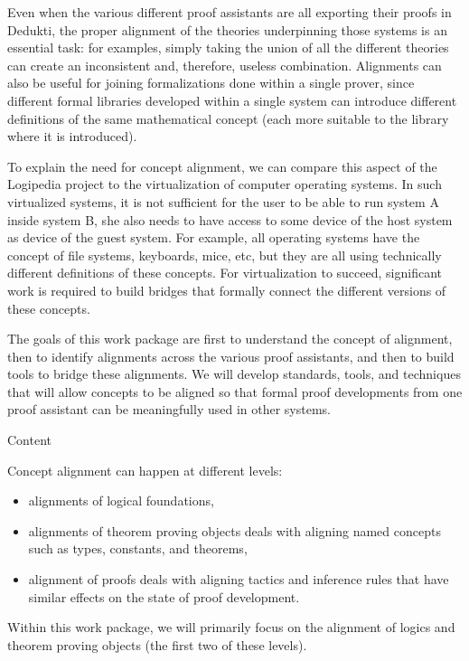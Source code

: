 Even when the various different proof assistants are all exporting their
proofs in Dedukti, the proper alignment of the theories underpinning
those systems is an essential task: for examples, simply taking the
union of all the different theories can create an inconsistent and,
therefore, useless combination.
%
Alignments can also be useful for joining formalizations done within a
single prover, since different formal libraries developed within a
single system can introduce different definitions of the same
mathematical concept (each more suitable to the library where it is
introduced).

To explain the need for concept alignment, we can compare this aspect
of the Logipedia project to the virtualization of computer operating
systems. In such virtualized systems, it is not sufficient for the
user to be able to run system A inside system B, she also needs to
have access to some device of the host system as device of the guest
system. For example, all operating systems have the concept of file
systems, keyboards, mice, etc, but they are all using technically
different definitions of these concepts.  For virtualization to
succeed, significant work is required to build bridges that formally
connect the different versions of these concepts.

The goals of this work package are first to understand the concept of
alignment, then to identify alignments across the various proof
assistants, and then to build tools to bridge these alignments. We
will develop standards, tools, and techniques that will allow concepts
to be aligned so that formal proof developments from one proof
assistant can be meaningfully used in other systems.

{\color{red} Content}

Concept alignment can happen at different levels:
\begin{itemize}
\item alignments of logical foundations,
\item alignments of theorem proving objects deals with aligning named concepts such as types,
  constants, and theorems,
\item alignment of proofs deals with aligning tactics and
  inference rules that have similar effects on the state of proof
  development.
\end{itemize}
Within this work package, we will primarily focus on the alignment of
logics and theorem proving objects (the first two of these levels).

\newcommand{\parag}[1]{\medskip \noindent {\bf #1}} 

